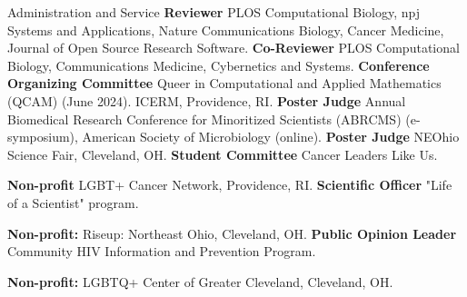 \begin{rubric}{Administration and Service}
%
\entry*[2024-] \textbf{Reviewer} PLOS Computational Biology, npj Systems and Applications, Nature Communications Biology, Cancer Medicine, Journal of Open Source Research Software.
\entry*[2022-] \textbf{Co-Reviewer} PLOS Computational Biology, Communications Medicine, Cybernetics and Systems.
%
\entry*[2023-24] \textbf{Conference Organizing Committee} Queer in Computational and Applied Mathematics (QCAM) (June 2024). ICERM, Providence, RI.
%
\entry*[April 2024] \textbf{Poster Judge} Annual Biomedical Research Conference for Minoritized Scientists (ABRCMS) (e-symposium), American Society of Microbiology (online).
\entry*[April 2022] \textbf{Poster Judge} NEOhio Science Fair, Cleveland, OH. 
%
\entry*[2023-] \textbf{Student Committee} Cancer Leaders Like Us. \par \textbf{Non-profit} LGBT+ Cancer Network, Providence, RI.
\entry*[2023-] \textbf{Scientific Officer} "Life of a Scientist" program. \par \textbf{Non-profit:} Riseup: Northeast Ohio, Cleveland, OH.
\entry*[2023-] \textbf{Public Opinion Leader} Community HIV Information and Prevention Program. \par \textbf{Non-profit:} LGBTQ+ Center of Greater Cleveland, Cleveland, OH.
%
\end{rubric}